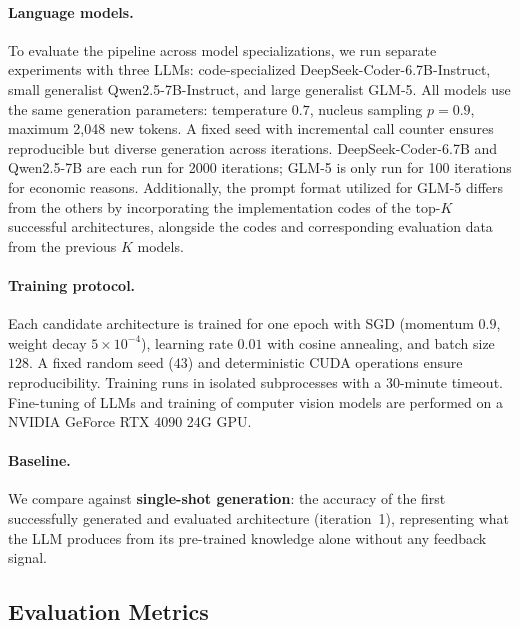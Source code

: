 \documentclass[10pt,twocolumn,letterpaper]{article}
\begin{document}
	\paragraph{Language models.} To evaluate the pipeline across model specializations, we run separate experiments with three LLMs: code-specialized DeepSeek-Coder-6.7B-Instruct, small generalist Qwen2.5-7B-Instruct, and large generalist GLM-5. All models use the same generation parameters: temperature $0.7$, nucleus sampling $p = 0.9$, maximum 2,048 new tokens. A fixed seed with incremental call counter ensures reproducible but diverse generation across iterations. DeepSeek-Coder-6.7B and Qwen2.5-7B are each run for 2000 iterations; GLM-5 is only run for 100 iterations for economic reasons. Additionally, the prompt format utilized for GLM-5 differs from the others by incorporating the implementation codes of the top-$K$ successful architectures, alongside the codes and corresponding evaluation data from the previous $K$ models.
	
	\paragraph{Training protocol.} Each candidate architecture is trained for one epoch with SGD (momentum $0.9$, weight decay $5 \times 10^{-4}$), learning rate $0.01$ with cosine annealing, and batch size $128$. A fixed random seed ($43$) and deterministic CUDA operations ensure reproducibility. Training runs in isolated subprocesses with a 30-minute timeout. Fine-tuning of LLMs and training of computer vision models are performed on a NVIDIA GeForce RTX 4090 24G GPU.
	
	\paragraph{Baseline.} We compare against \textbf{single-shot generation}: the accuracy of the first successfully generated and evaluated architecture (iteration~1), representing what the LLM produces from its pre-trained knowledge alone without any feedback signal.
	
	\subsection{Evaluation Metrics}
	\label{sec:metrics}
	
\end{document}
